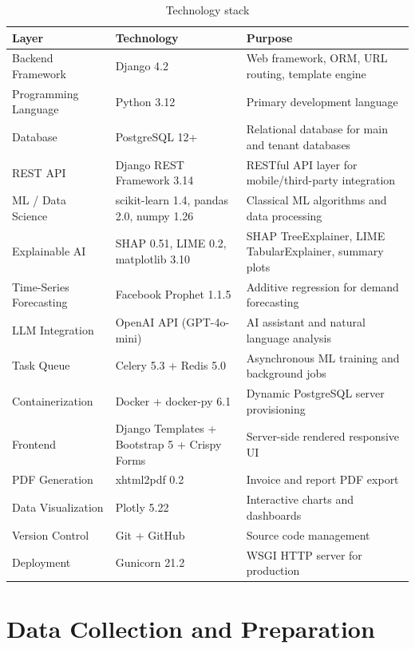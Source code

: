 \documentclass[12pt,a4paper]{report}
\begin{document}
\begin{table}[H]
\centering
\caption{Technology stack}
\label{tab:tech_stack}
\begin{tabularx}{\textwidth}{l l >{\raggedright\arraybackslash}X}
\toprule
\textbf{Layer} & \textbf{Technology} & \textbf{Purpose} \\
\midrule
Backend Framework & Django 4.2 & Web framework, ORM, URL routing, template engine \\
Programming Language & Python 3.12 & Primary development language \\
Database & PostgreSQL 12+ & Relational database for main and tenant databases \\
REST API & Django REST Framework 3.14 & RESTful API layer for mobile/third-party integration \\
ML / Data Science & scikit-learn 1.4, pandas 2.0, numpy 1.26 & Classical ML algorithms and data processing \\
Explainable AI & SHAP 0.51, LIME 0.2, matplotlib 3.10 & SHAP TreeExplainer, LIME TabularExplainer, summary plots \\
Time-Series Forecasting & Facebook Prophet 1.1.5 & Additive regression for demand forecasting \\
LLM Integration & OpenAI API (GPT-4o-mini) & AI assistant and natural language analysis \\
Task Queue & Celery 5.3 + Redis 5.0 & Asynchronous ML training and background jobs \\
Containerization & Docker + docker-py 6.1 & Dynamic PostgreSQL server provisioning \\
Frontend & Django Templates + Bootstrap 5 + Crispy Forms & Server-side rendered responsive UI \\
PDF Generation & xhtml2pdf 0.2 & Invoice and report PDF export \\
Data Visualization & Plotly 5.22 & Interactive charts and dashboards \\
Version Control & Git + GitHub & Source code management \\
Deployment & Gunicorn 21.2 & WSGI HTTP server for production \\
\bottomrule
\end{tabularx}
\end{table}


\section{Data Collection and Preparation}
\label{sec:data_collection}
\end{document}
